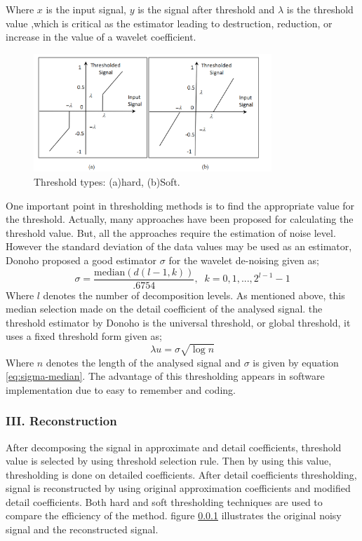 \documentclass[12pt, a4paper, twoside]{report}
\begin{document}
Where $x$  is the input signal, $y$ is the signal after threshold and  $\lambda$ is the threshold value ,which is critical as the estimator leading to destruction, reduction, or increase in the value of a wavelet coefficient.

\begin{figure}[!h]
	\centering
	\includegraphics[width=0.8\textwidth]
	{images/chapter3/threshold-types}
	\caption{Threshold types: (a)hard, (b)Soft.}
	\label{fig:threshold-types}
\end{figure}

One important point in thresholding methods   is to find the appropriate value for the threshold. Actually, many approaches have   been proposed for calculating the threshold value. But, all the approaches require the estimation of   noise level. However the standard deviation of the data values may be used as an estimator, Donoho proposed a good estimator $\sigma$ for the wavelet de-noising given as;
\begin{equation}
\sigma = \frac{\text{median}(d (l-1,k))}{.6754}, \; \; k = 0, 1,...,2^{l-1} - 1
\label{eq:sigma-median}
\end{equation}
Where $l$ denotes the number of decomposition levels. As mentioned above, this median selection made on the detail coefficient of the analysed signal. 
the threshold estimator by Donoho is the  universal threshold, or global threshold, it uses a fixed threshold form given as;
\begin{equation}
\lambda u = \sigma \sqrt{\log n}
\end{equation}
Where $n$ denotes the length of the analysed signal and $\sigma$ is given by equation \ref{eq:sigma-median}. The advantage of this thresholding appears in software implementation due to easy to remember and coding.

\subsubsection{III. Reconstruction}
After  decomposing  the  signal  in approximate  and  detail  coefficients, threshold  value  is  selected  by  using threshold  selection  rule.  Then  by  using this  value,  thresholding  is  done  on detailed  coefficients.  After  detail coefficients  thresholding,  signal  is reconstructed  by  using  original approximation  coefficients  and  modified detail  coefficients.  Both hard and soft thresholding techniques are used   to compare the efficiency of the method. figure \ref{} illustrates the original noisy signal and the reconstructed signal.
\end{document}
